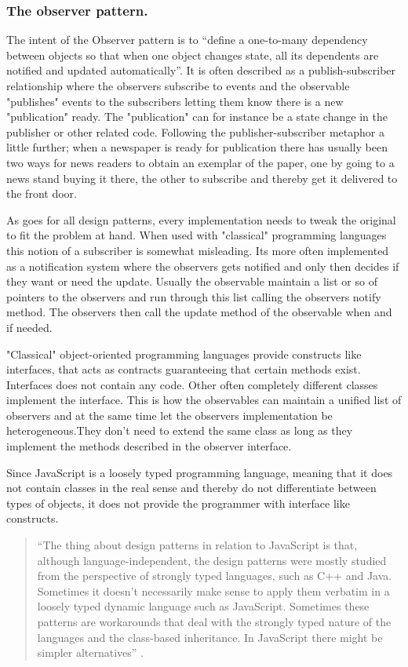 \documentclass[english]{ifimaster}
\begin{document}
\subsubsection{The observer pattern.}
The intent of the Observer pattern is to “define a one-to-many dependency between objects so that when one object changes state, all its dependents are notified and updated automatically”\parencite[p. 9]{gamma}. It is often described as a publish-subscriber relationship where the observers subscribe to events and the observable "publishes" events to the subscribers letting them know there is a new "publication" ready. The "publication" can for instance be a state change in the publisher or other related code. Following the publisher-subscriber metaphor a little further; when a newspaper is ready for publication there has usually been two ways for news readers to obtain an exemplar of the paper, one by going to a news stand buying it there, the other to subscribe and thereby get it delivered to the front door\parencite[p. 171-174]{stefanov}.

As goes for all design patterns, every implementation needs to tweak the original to fit the problem at hand. When used with "classical" programming languages this notion of a subscriber is somewhat misleading. Its more often implemented as a notification system where the observers gets notified and only then decides if they want or need the update. Usually the observable maintain a list or so of pointers to the observers and run through this list calling the observers notify method. The observers then call the update method of the observable when and if needed.

"Classical" object-oriented programming languages provide constructs like interfaces, that acts as contracts guaranteeing that certain methods exist. Interfaces does not contain any code. Other often completely different classes implement the interface. This is how the observables can maintain a unified list of observers and at the same time let the observers implementation be heterogeneous.They don't need to extend the same class as long as they implement the methods described in the observer interface. 

Since JavaScript is a loosely typed programming language, meaning that it does not contain classes in the real sense and thereby do not differentiate between types of objects, it does not provide the programmer with interface like constructs.  

\begin{quotation}
“The thing about design patterns in relation to JavaScript is that, although language-independent, the design patterns were mostly studied from the perspective of strongly typed languages, such as C++ and Java. Sometimes it doesn’t necessarily make sense to apply them verbatim in a loosely typed dynamic language such as JavaScript. Sometimes these patterns are workarounds that deal with the strongly typed nature of the languages and the class-based inheritance. In JavaScript there might be simpler alternatives” \parencite[s. 2]{stefanov}.
\end{quotation}
\end{document}
